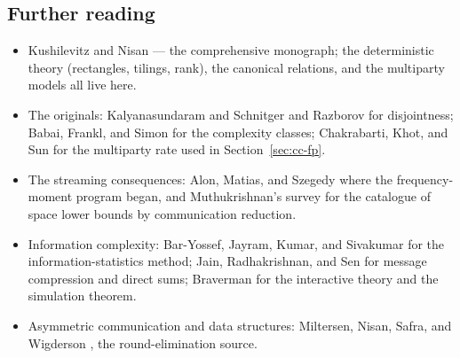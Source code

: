 \subsection{Further reading}

\begin{itemize}
\item Kushilevitz and Nisan \citep{communication-complexity-bg1} --- the
  comprehensive monograph; the deterministic theory (rectangles, tilings, rank), the
  canonical relations, and the multiparty models all live here.
\item The originals: Kalyanasundaram and Schnitger \citep{communication-complexity-bg3}
  and Razborov \citep{communication-complexity-bg4} for disjointness; Babai, Frankl,
  and Simon \citep{communication-complexity-bg2} for the complexity classes;
  Chakrabarti, Khot, and Sun \citep{communication-complexity-bg9} for the multiparty
  rate used in Section~\ref{sec:cc-fp}.
\item The streaming consequences: Alon, Matias, and Szegedy
  \citep{communication-complexity-bg6} where the frequency-moment program began, and
  Muthukrishnan's survey \citep{communication-complexity-bg7} for the catalogue of
  space lower bounds by communication reduction.
\item Information complexity: Bar-Yossef, Jayram, Kumar, and Sivakumar
  \citep{communication-complexity-bg5} for the information-statistics method; Jain,
  Radhakrishnan, and Sen \citep{communication-complexity-bg10} for message
  compression and direct sums; Braverman \citep{communication-complexity-bg11} for
  the interactive theory and the simulation theorem.
\item Asymmetric communication and data structures: Miltersen, Nisan, Safra, and
  Wigderson \citep{communication-complexity-bg8}, the round-elimination source.
\end{itemize}

